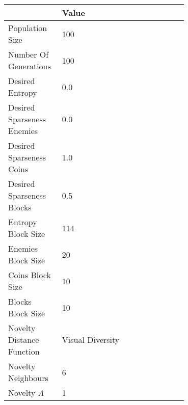 \begin{tabular}{lp{0.7\linewidth}}
\toprule
{} &             Value \\
\midrule
Population Size            &               100 \\
Number Of Generations      &               100 \\
Desired Entropy            &               0.0 \\
Desired Sparseness Enemies &               0.0 \\
Desired Sparseness Coins   &               1.0 \\
Desired Sparseness Blocks  &               0.5 \\
Entropy Block Size         &               114 \\
Enemies Block Size         &                20 \\
Coins Block Size           &                10 \\
Blocks Block Size          &                10 \\
Novelty Distance Function  &  Visual Diversity \\
Novelty Neighbours         &                 6 \\
Novelty $\Lambda$          &                 1 \\
\bottomrule
\end{tabular}
